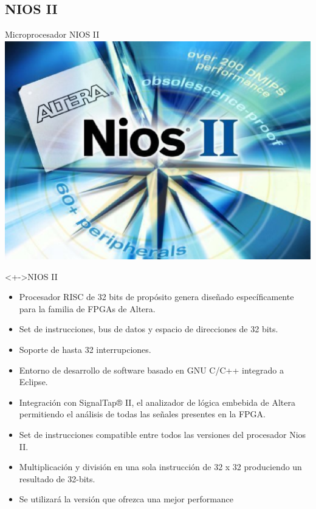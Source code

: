 \documentclass[xcolor=dvipsnames]{beamer}
\begin{document}
\subsection{NIOS II}
\begin{frame}{Microprocesador NIOS II}
\center
\includegraphics[scale=0.20]{figures/nios2.eps}
   \begin{block}<+->{NIOS II}	
    \begin{itemize}
	\scriptsize
     	\item Procesador RISC de 32 bits de propósito genera diseñado específicamente para la familia de FPGAs de Altera.
	\item Set de instrucciones, bus de datos y espacio de direcciones de 32 bits.
	\item Soporte de hasta 32 interrupciones.
	\item Entorno de desarrollo de software basado en GNU C/C++ integrado a Eclipse.
	\item Integración con SignalTap® II, el analizador de lógica embebida de Altera permitiendo el análisis  de todas las señales presentes en la FPGA.
	\item Set de instrucciones compatible entre todos las versiones del procesador Nios II.
	\item Multiplicación y división en una sola instrucción de 32 x 32 produciendo un resultado de 32-bits.
	\item Se utilizará la versión que ofrezca una mejor performance
    \end{itemize}	
  \end{block}
\end{frame}
\end{document}

